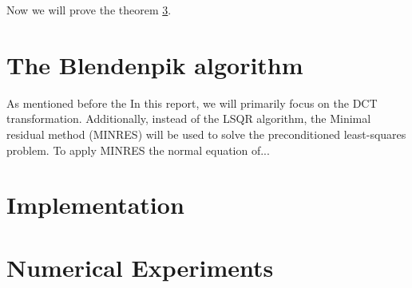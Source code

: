\documentclass{article}
\begin{document}
Now we will prove the theorem \ref{}. 

\section{The Blendenpik algorithm}
As mentioned before the In this report, we will primarily focus on the DCT transformation. Additionally, instead of the LSQR algorithm, the Minimal residual method (MINRES) will be used to solve the preconditioned least-squares problem. To apply MINRES the normal equation of...




\section{Implementation}

\section{Numerical Experiments}


 

\end{document}
